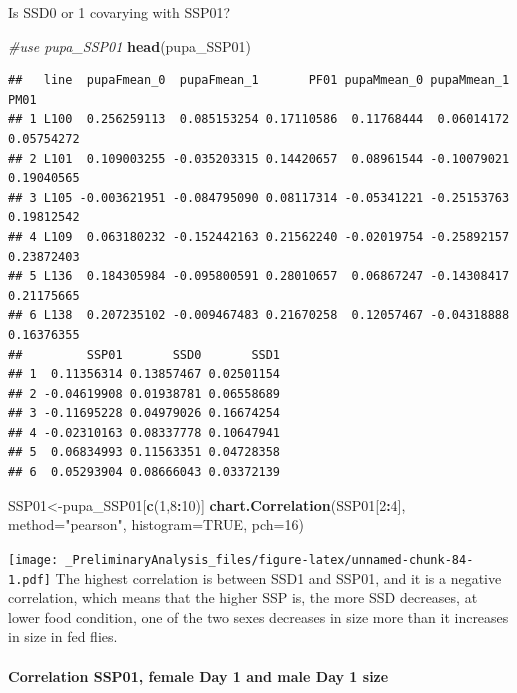 \documentclass[
]{article}
\newenvironment{Shaded}{\begin{snugshade}}{\end{snugshade}}
\newcommand{\CommentTok}[1]{\textcolor[rgb]{0.56,0.35,0.01}{\textit{#1}}}
\newcommand{\DataTypeTok}[1]{\textcolor[rgb]{0.13,0.29,0.53}{#1}}
\newcommand{\DecValTok}[1]{\textcolor[rgb]{0.00,0.00,0.81}{#1}}
\newcommand{\KeywordTok}[1]{\textcolor[rgb]{0.13,0.29,0.53}{\textbf{#1}}}
\newcommand{\NormalTok}[1]{#1}
\newcommand{\OperatorTok}[1]{\textcolor[rgb]{0.81,0.36,0.00}{\textbf{#1}}}
\newcommand{\OtherTok}[1]{\textcolor[rgb]{0.56,0.35,0.01}{#1}}
\newcommand{\StringTok}[1]{\textcolor[rgb]{0.31,0.60,0.02}{#1}}
\begin{document}
Is SSD0 or 1 covarying with SSP01?

\begin{Shaded}
\begin{Highlighting}[]
\CommentTok{#use pupa_SSP01 }
\KeywordTok{head}\NormalTok{(pupa_SSP01)}
\end{Highlighting}
\end{Shaded}

\begin{verbatim}
##   line  pupaFmean_0  pupaFmean_1       PF01 pupaMmean_0 pupaMmean_1       PM01
## 1 L100  0.256259113  0.085153254 0.17110586  0.11768444  0.06014172 0.05754272
## 2 L101  0.109003255 -0.035203315 0.14420657  0.08961544 -0.10079021 0.19040565
## 3 L105 -0.003621951 -0.084795090 0.08117314 -0.05341221 -0.25153763 0.19812542
## 4 L109  0.063180232 -0.152442163 0.21562240 -0.02019754 -0.25892157 0.23872403
## 5 L136  0.184305984 -0.095800591 0.28010657  0.06867247 -0.14308417 0.21175665
## 6 L138  0.207235102 -0.009467483 0.21670258  0.12057467 -0.04318888 0.16376355
##         SSP01       SSD0       SSD1
## 1  0.11356314 0.13857467 0.02501154
## 2 -0.04619908 0.01938781 0.06558689
## 3 -0.11695228 0.04979026 0.16674254
## 4 -0.02310163 0.08337778 0.10647941
## 5  0.06834993 0.11563351 0.04728358
## 6  0.05293904 0.08666043 0.03372139
\end{verbatim}

\begin{Shaded}
\begin{Highlighting}[]
\NormalTok{SSP01<-pupa_SSP01[}\KeywordTok{c}\NormalTok{(}\DecValTok{1}\NormalTok{,}\DecValTok{8}\OperatorTok{:}\DecValTok{10}\NormalTok{)]}
\KeywordTok{chart.Correlation}\NormalTok{(SSP01[}\DecValTok{2}\OperatorTok{:}\DecValTok{4}\NormalTok{],}
                   \DataTypeTok{method=}\StringTok{"pearson"}\NormalTok{,}
                   \DataTypeTok{histogram=}\OtherTok{TRUE}\NormalTok{,}
                   \DataTypeTok{pch=}\DecValTok{16}\NormalTok{)}
\end{Highlighting}
\end{Shaded}

\texttt{[image: \_PreliminaryAnalysis\_files/figure-latex/unnamed-chunk-84-1.pdf]}
The highest correlation is between SSD1 and SSP01, and it is a negative
correlation, which means that the higher SSP is, the more SSD decreases,
at lower food condition, one of the two sexes decreases in size more
than it increases in size in fed flies.

\hypertarget{correlation-ssp01-female-day-1-and-male-day-1-size}{%
\paragraph{Correlation SSP01, female Day 1 and male Day 1
size}\label{correlation-ssp01-female-day-1-and-male-day-1-size}}
\end{document}
